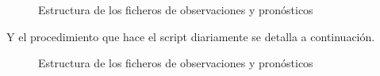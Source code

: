 \documentclass[
  10pt,
  a4paper,
  DIV=11,
  numbers=noendperiod,
  open=any]{scrreprt}
\numberwithin{equation}{chapter}
\numberwithin{equation}{section}
\renewcommand{\[}{\begin{equation}}
\renewcommand{\]}{\end{equation}}
\begin{document}
\begin{figure}[h]
  \centering
  \caption{Estructura de los ficheros de observaciones y pronósticos}
\end{figure}

Y el procedimiento que hace el script diariamente se detalla a
continuación.

\begin{figure}[h]
  \centering
  \caption{Estructura de los ficheros de observaciones y pronósticos}
\end{figure}
\end{document}
